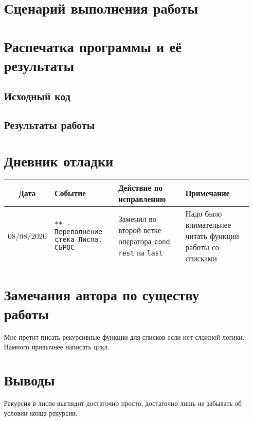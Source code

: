 \documentclass[12pt]{article}
\begin{document}
\section{Сценарий выполнения работы}
\section{Распечатка программы и её результаты}

\subsection{Исходный код}

\subsection{Результаты работы}

\section{Дневник отладки}
\noindent
\begin{tabularx}{\linewidth}{|c|X|X|X|}
\hline
Дата & Событие & Действие по исправлению & Примечание \\
\hline
08/08/2020 & {\tt *** - Переполнение стека Лиспа. СБРОС} & Заменил во второй ветке оператора {\tt cond} {\tt rest} на {\tt last} & Надо было внимательнее читать функции работы со списками\\
\hline
\end{tabularx}

\section{Замечания автора по существу работы}

Мне претит писать рекурсивные функции для списков если нет сложной логики.
Намного привычнее написать цикл.

\section{Выводы}

Рекурсия в лиспе выглядит достаточно просто,
достаточно лишь не забывать об условии конца рекурсии.
\end{document}
